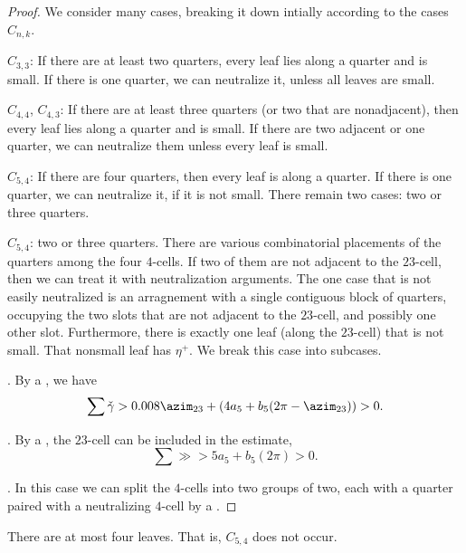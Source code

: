 \begin{proof} We consider many cases, breaking it down intially according to the cases $C_{n,k}$.

$C_{3,3}$:  If there are at least two quarters, every leaf lies along a quarter and is small.
If there is one quarter, we can neutralize it, unless all leaves are small.

$C_{4,4}$, $C_{4,3}$: If there are at least three quarters (or two that are nonadjacent), then every leaf lies along a quarter
and is small.  If there are two adjacent or one quarter, we can neutralize them unless every leaf is small.

$C_{5,4}$: If there are four quarters, then every leaf is along a quarter.
If there is one quarter, we can neutralize it, if it is not small.
There remain two cases: two or three quarters.

$C_{5,4}$: two or three quarters.  There are various combinatorial placements of the quarters among the four $4$-cells.  If two of them are not adjacent to the $23$-cell, then we can treat it with neutralization arguments.  The one case that is not easily neutralized is an arragnement with a single contiguous block of quarters, occupying the two slots that are not adjacent to the $23$-cell, and possibly one other slot.  Furthermore, there is exactly one leaf (along the $23$-cell) that is not small.   That nonsmall leaf has $\eta^+$.  We break this case into subcases.

.  By a , we have
\[
\sum \gg > 0.008 \azim_{23} + (4 a_5 + b_5 (2\pi-\azim_{23})) > 0.
\]

.
By a , the $23$-cell can be included in the estimate,
\[
\sum \gg > 5 a_5 + b_5 (2\pi) > 0.
\]

.
In this case we can split the $4$-cells into two groups of two, each with
a quarter paired with a neutralizing $4$-cell by a .
\end{proof}

\begin{lemma}  There are at most four leaves.  That is, $C_{5,4}$ does not occur.
\end{lemma}

